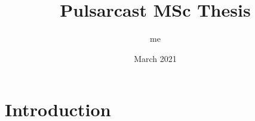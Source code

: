 \documentclass{article}
\title{Pulsarcast MSc Thesis}
\author{me }
\date{March 2021}
\begin{document}
\maketitle

\section{Introduction}
\end{document}
